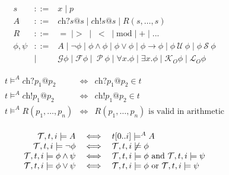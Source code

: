 \documentclass[conference]{IEEEtran}
\theoremstyle{definition}
\newcommand{\sch}{\textit{ch}}
\newcommand{\prin}{\textit{O}}
\newcommand{\atom}{A}
\newcommand{\tr}{t\xspace}
\newcommand{\tset}{\ensuremath{\mathcal{T}}\xspace}
\newcommand{\talways}{\mathcal{G}}
\newcommand{\tfuture}{\mathcal{F}}
\newcommand{\tuntil}{~\mathcal{U}~}
\newcommand{\tsince}{~\mathcal{S}~}
\newcommand{\tpast}{~\mathcal{P}~}
\newcommand{\tknows}[1]{\mathcal{K}_{#1}}
\newcommand{\tpossible}[1]{\mathcal{L}_{#1}}
\newcommand{\limplies}{\rightarrow}
\begin{document}
\begin{figure}[t]
  \small
  \begin{displaymath}
    \begin{array}{rcl}
      s & ::= & x \mid p \\ %
      \atom & ::= & 
      \sch?s@s \mid \sch!s@s \mid R(s , \ldots , s)\\
      R & ::= & =\;\mid>\;\mid\;<\;\mid \textrm{mod} \mid + \mid ... \\
      \phi, \psi & ::= &
      \atom
      \mid \neg \phi
      \mid \phi \wedge \phi
      \mid \phi \vee \phi
      \mid \phi \limplies \phi
      \mid \phi \tuntil \phi
      \mid \phi \tsince \phi \\
      & \mid & \talways \phi
      \mid \tfuture \phi
      \mid \tpast \phi
      \mid \forall x . \phi
      \mid \exists x . \phi
      \mid \tknows{\prin} \phi
      \mid \tpossible{\prin} \phi
      
    \end{array}
  \end{displaymath}

    \begin{displaymath}
    \begin{array}{rcl}
      \tr \models^A \sch?p_1@p_2 & \iff & \sch?p_1@p_2 \in \tr \\
      \tr \models^A \sch!p_1@p_2 & \iff & \sch!p_1@p_2 \in \tr \\
      \tr \models^A R(p_1, \ldots , p_n) & \iff & R(p_1, \ldots , p_n) \text{~is
      valid in arithmetic} \\
    \end{array}
  \end{displaymath}


  \begin{displaymath}
    \begin{array}{rcl}
      \tset, \tr, i \models \atom & \iff &
      \tr[0..i] \models^A \atom  \\

      \tset, \tr, i \models \neg \phi & \iff &
      \tset, \tr, i  \not \models \phi \\

      \tset, \tr, i  \models \phi \land \psi & \iff &
      \tset, \tr, i  \models \phi \hbox{ and } \tset, \tr, i  \models \psi \\

      \tset, \tr, i  \models \phi \lor \psi & \iff &
      \tset, \tr, i  \models \phi \hbox{ or } \tset, \tr, i  \models \psi \\


\end{array}
\end{displaymath}
\end{figure}
\end{document}
